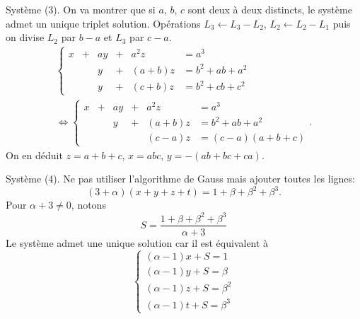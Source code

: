Système (3). On va montrer que si $a$, $b$, $c$ sont deux à deux distincts, le système admet un unique triplet solution.\newline
Opérations $L_3 \leftarrow L_3 - L_2$, $L_2 \leftarrow L_2 - L_1$ puis on divise $L_2$ par $b-a$ et $L_3$ par $c-a$.
\begin{multline*}
  \left\lbrace 
  \begin{alignedat}{4}
    x &+& ay &+& a^2z   &= a^3 \\
      & & y  &+& (a+b)z &= b^2 + ab + a^2 \\
      & & y  &+& (c+b)z &= b^2 + cb + c^2
  \end{alignedat}
\right. \\
\Leftrightarrow
  \left\lbrace 
  \begin{alignedat}{4}
    x &+& ay &+& a^2z   &= a^3 \\
      & & y  &+& (a+b)z &= b^2 + ab + a^2 \\
      & &    & & (c-a)z &= (c-a)(a+b+c)
  \end{alignedat}
\right. .
\end{multline*}
On en déduit $z=a+b+c$, $x = abc$, $y=-(ab +bc+ca)$.

Système (4).\newline
Ne pas utiliser l'algorithme de Gauss mais ajouter toutes les lignes:
\[
  (3+\alpha)(x+y+z+t) = 1+\beta+\beta^2+\beta^3.
\]
Pour $\alpha + 3 \neq 0$, notons
\[
  S = \frac{1+\beta+\beta^2+\beta^3}{\alpha + 3}
\]
Le système admet une unique solution car il est équivalent à
\[
  \left\lbrace 
  \begin{aligned}
    (\alpha - 1)x + S = 1 \\
    (\alpha - 1)y + S = \beta \\
    (\alpha - 1)z + S = \beta^2 \\
    (\alpha - 1)t + S = \beta^3 
  \end{aligned}
\right.
\]


